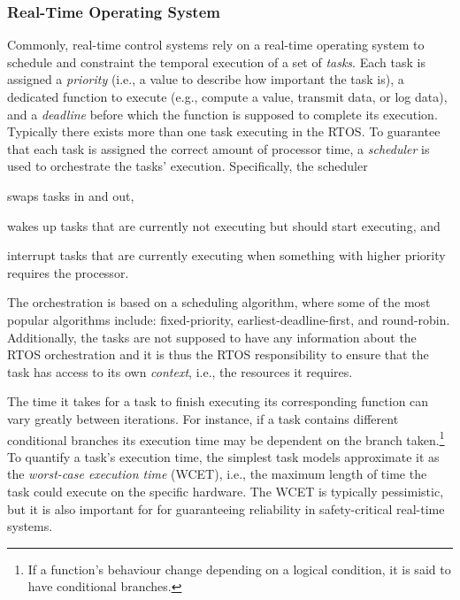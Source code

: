 \subsubsection{Real-Time Operating System}%
%
Commonly, real-time control systems rely on a real-time operating system to schedule and constraint the temporal execution of a set of \emph{tasks}.
Each task is assigned a \emph{priority} (i.e., a value to describe how important the task is), a dedicated function to execute (e.g., compute a value, transmit data, or log data), and a \emph{deadline} before which the function is supposed to complete its execution.
Typically there exists more than one task executing in the RTOS.
To guarantee that each task is assigned the correct amount of processor time, a \emph{scheduler} is used to orchestrate the tasks' execution.
Specifically, the scheduler
\begin{enumerate*}[label = (\roman*)]
    \item swaps tasks in and out,
    \item wakes up tasks that are currently not executing but should start executing, and
    \item interrupt tasks that are currently executing when something with higher priority requires the processor.
\end{enumerate*}
The orchestration is based on a scheduling algorithm, where some of the most popular algorithms include: fixed-priority, earliest-deadline-first, and round-robin.
Additionally, the tasks are not supposed to have any information about the RTOS orchestration and it is thus the RTOS responsibility to ensure that the task has access to its own \emph{context}, i.e., the resources it requires. 

The time it takes for a task to finish executing its corresponding function can vary greatly between iterations.
For instance, if a task contains different conditional branches its execution time may be dependent on the branch taken.\footnote{If a function's behaviour change depending on a logical condition, it is said to have conditional branches.}
To quantify a task's execution time, the simplest task models approximate it as the \emph{worst-case execution time} (WCET), i.e., the maximum length of time the task could execute on the specific hardware.
The WCET is typically pessimistic, but it is also important for for guaranteeing reliability in safety-critical real-time systems.

